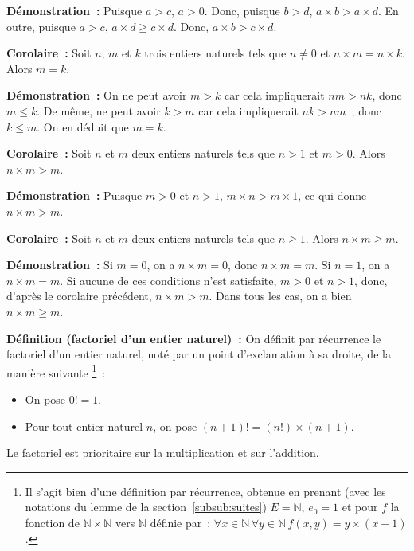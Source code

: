 \medskip

\noindent\textbf{Démonstration :} Puisque $a > c$, $a > 0$.
    Donc, puisque $b > d$, $a \times b > a \times d$. 
    En outre, puisque $a > c$, $a \times d \geq c \times d$.
    Donc, $a \times b > c \times d$.

   \done 

\medskip

\noindent\textbf{Corolaire :} Soit $n$, $m$ et $k$ trois entiers naturels tels que $n \neq 0$ et $n \times m = n \times k$. 
    Alors $m = k$.

\medskip

\noindent\textbf{Démonstration :} On ne peut avoir $m > k$ car cela impliquerait $n m > n k$, donc $m \leq k$.
   De même, ne peut avoir $k > m$ car cela impliquerait $n k > n m$ ; donc $k \leq m$. 
   On en déduit que $m = k$.

  \done 

\medskip

\noindent\textbf{Corolaire :} Soit $n$ et $m$ deux entiers naturels tels que $n > 1$ et $m > 0$. 
    Alors $n \times m > m$.

\medskip

\noindent\textbf{Démonstration :} Puisque $m > 0$ et $n > 1$, $m \times n > m \times 1$, ce qui donne $n \times m > m$.

   \done 

\medskip

\noindent\textbf{Corolaire :} Soit $n$ et $m$ deux entiers naturels tels que $n \geq 1$. 
    Alors $n \times m \geq m$.

\medskip

\noindent\textbf{Démonstration :} 
    Si $m = 0$, on a $n \times m = 0$, donc $n \times m = m$.
    Si $n = 1$, on a $n \times m = m$.
    Si aucune de ces conditions n'est satisfaite, $m > 0$ et $n > 1$, donc, d'après le corolaire précédent, $n \times m > m$.
    Dans tous les cas, on a bien $n \times m \geq m$.

   \done 

\medskip

\noindent\textbf{Définition (factoriel d'un entier naturel) :} On définit par récurrence le factoriel d'un entier naturel, noté par un point d'exclamation à sa droite, de la manière suivante%
\footnote{
    Il s'agit bien d'une définition par récurrence, obtenue en prenant (avec les notations du lemme de la section~\ref{subsub:suites}) $E = \mathbb{N}$, $e_0 = 1$ et pour $f$ la fonction de $\mathbb{N} \times \mathbb{N}$ vers $\mathbb{N}$ définie par : $\forall x \in \mathbb{N} \, \forall y \in \mathbb{N} \, f(x,y) = y \times (x+1)$.
}~:
\begin{itemize}[nosep]
    \item On pose $0! = 1$.
    \item Pour tout entier naturel $n$, on pose $(n+1)! = (n!) \times (n+1)$.
\end{itemize}
Le factoriel est prioritaire sur la multiplication et sur l'addition. 

